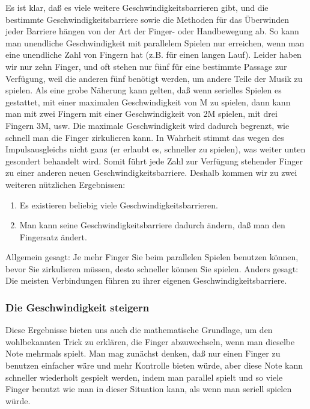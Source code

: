 Es ist klar, daß es viele weitere Geschwindigkeitsbarrieren gibt, und die bestimmte Geschwindigkeitsbarriere sowie die Methoden für das Überwinden jeder Barriere hängen von der Art der Finger- oder Handbewegung ab.
So kann man unendliche Geschwindigkeit mit parallelem Spielen nur erreichen, wenn man eine unendliche Zahl von Fingern hat (z.B. für einen langen Lauf).
Leider haben wir nur zehn Finger, und oft stehen nur fünf für eine bestimmte Passage zur Verfügung, weil die anderen fünf benötigt werden, um andere Teile der Musik zu spielen.
Als eine grobe Näherung kann gelten, daß wenn serielles Spielen es gestattet, mit einer maximalen Geschwindigkeit von M zu spielen, dann kann man mit zwei Fingern mit einer Geschwindigkeit von 2M spielen, mit drei Fingern 3M, usw.
Die maximale Geschwindigkeit wird dadurch begrenzt, wie schnell man die Finger zirkulieren kann.
In Wahrheit stimmt das wegen des Impulsausgleichs nicht ganz (er erlaubt es, schneller zu spielen), was weiter unten gesondert behandelt wird.
Somit führt jede Zahl zur Verfügung stehender Finger zu einer anderen neuen Geschwindigkeitsbarriere.
Deshalb kommen wir zu zwei weiteren nützlichen Ergebnissen: 

\begin{enumerate} 
 \item Es existieren beliebig viele Geschwindigkeitsbarrieren.
 \item Man kann seine Geschwindigkeitsbarriere dadurch ändern, daß man den Fingersatz ändert.
\end{enumerate}
Allgemein gesagt: Je mehr Finger Sie beim parallelen Spielen benutzen können, bevor Sie zirkulieren müssen, desto schneller können Sie spielen.
Anders gesagt: Die meisten Verbindungen führen zu ihrer eigenen Geschwindigkeitsbarriere.


\subsubsection{Die Geschwindigkeit steigern}
\label{c1iv2c}

Diese Ergebnisse bieten uns auch die mathematische Grundlage, um den wohlbekannten Trick zu erklären, die Finger abzuwechseln, wenn man dieselbe Note mehrmals spielt.
Man mag zunächst denken, daß nur einen Finger zu benutzen einfacher wäre und mehr Kontrolle bieten würde, aber diese Note kann schneller wiederholt gespielt werden, indem man parallel spielt und so viele Finger benutzt wie man in dieser Situation kann, als wenn man seriell spielen würde.

